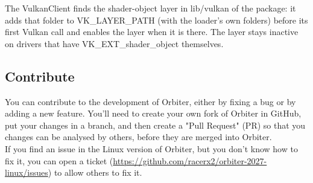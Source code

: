 \documentclass[Orbiter Developer Manual.tex]{subfiles}
\begin{document}
\noindent
The VulkanClient finds the shader-object layer in lib/vulkan of the package: it adds that folder to VK\_LAYER\_PATH (with the loader's own folders) before its first Vulkan call and enables the layer when it is there. The layer stays inactive on drivers that have VK\_EXT\_shader\_object themselves.


\subsection{Contribute}
You can contribute to the development of Orbiter, either by fixing a bug or by adding a new feature. You'll need to create your own fork of Orbiter in GitHub, put your changes in a branch, and then create a "Pull Request" (PR) so that you changes can be analysed by others, before they are merged into Orbiter.\\
If you find an issue in the Linux version of Orbiter, but you don't know how to fix it, you can open a ticket (\url{https://github.com/racerx2/orbiter-2027-linux/issues}) to allow others to fix it.
\end{document}
